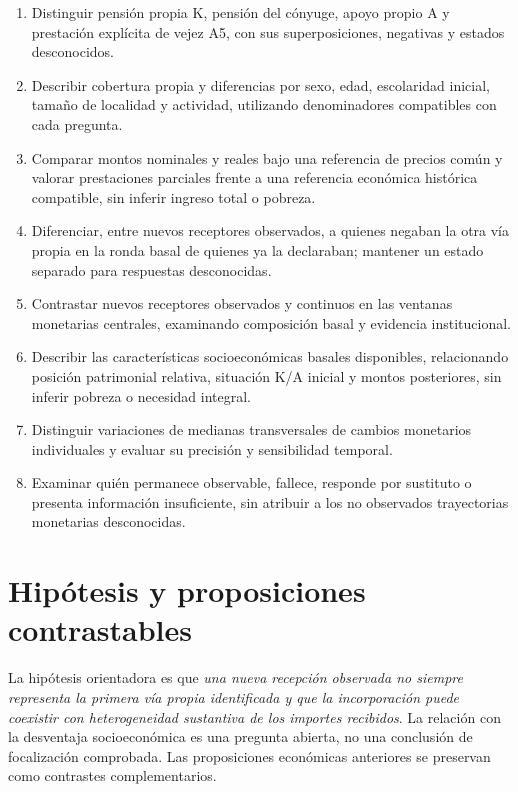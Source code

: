 \begin{enumerate}
\item Distinguir pensión propia K, pensión del cónyuge, apoyo propio A y
prestación explícita de vejez A5, con sus superposiciones, negativas y
estados desconocidos.
\item Describir cobertura propia y diferencias por sexo, edad, escolaridad
inicial, tamaño de localidad y actividad, utilizando denominadores
compatibles con cada pregunta.
\item Comparar montos nominales y reales bajo una referencia de precios
común y valorar prestaciones parciales frente a una referencia económica
histórica compatible, sin inferir ingreso total o pobreza.
\item Diferenciar, entre nuevos receptores observados, a quienes
negaban la otra vía propia en la ronda basal de quienes ya la declaraban;
mantener un estado separado para respuestas desconocidas.
\item Contrastar nuevos receptores observados y continuos en las ventanas
monetarias centrales, examinando composición basal y evidencia institucional.
\item Describir las características socioeconómicas basales disponibles,
relacionando posición patrimonial relativa, situación K/A inicial y
montos posteriores, sin inferir pobreza o necesidad integral.
\item Distinguir variaciones de medianas transversales de cambios monetarios
individuales y evaluar su precisión y sensibilidad temporal.
\item Examinar quién permanece observable, fallece, responde por sustituto
o presenta información insuficiente, sin atribuir a los no observados
trayectorias monetarias desconocidas.
\end{enumerate}

\section{Hipótesis y proposiciones contrastables}
\label{sec:hipotesis}

La hipótesis orientadora es que \emph{una nueva recepción observada no siempre
representa la primera vía propia identificada y que la incorporación puede
coexistir con heterogeneidad sustantiva de los importes recibidos}.
La relación con la desventaja socioeconómica es una pregunta abierta, no
una conclusión de focalización comprobada. Las proposiciones económicas
anteriores se preservan como contrastes complementarios.

